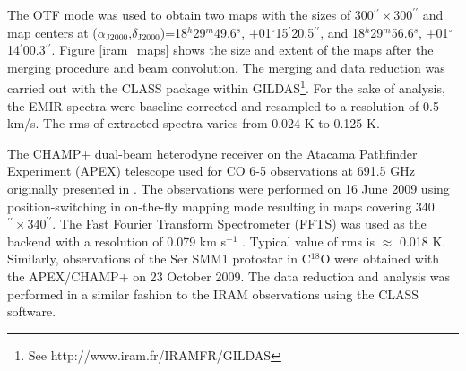 \documentclass{aa}
\begin{document}
The OTF mode was used to obtain two maps with the sizes of 300$^{\prime\prime}\times300^{\prime\prime}$ 
and map centers at ($\alpha_\mathrm{J2000}$,$\delta_\mathrm{J2000}$)=18$^h$29$^m$49.6$^s$,
+01$^{\circ}$15$^{\prime}$20.5$^{\prime\prime}$, and 18$^h$29$^m$56.6$^s$, +01$^{\circ}$14$^{\prime}$00.3$^{\prime\prime}$. 
Figure \ref{iram_maps} shows the size and extent of the maps after the merging procedure 
and beam convolution. The merging and data reduction was carried out with the CLASS package within GILDAS\footnote{See
http://www.iram.fr/IRAMFR/GILDAS}. For the sake of analysis, the EMIR spectra were
baseline-corrected and resampled to a resolution of 0.5 km/s. The rms of extracted spectra varies from 0.024 K to 0.125 K. 

The CHAMP+ dual-beam heterodyne receiver on the Atacama Pathfinder Experiment (APEX) telescope used for CO 6-5 observations at 691.5 GHz originally presented in \citealt{Yil15}. The observations were performed on 16 June 2009 using position-switching in on-the-fly mapping mode resulting in maps covering 340$^{\prime\prime}\times 340^{\prime\prime}$. The Fast Fourier Transform Spectrometer (FFTS) was used as the backend with a resolution of 0.079 km s$^{-1}$ \citep{Kle06}. Typical value of rms is $\approx$ 0.018 K. 
Similarly, observations of the Ser SMM1 protostar in C$^{18}$O were obtained with the APEX/CHAMP+ on 23 October 2009. The data reduction and analysis was performed in a similar fashion to the IRAM observations using the CLASS software.
\end{document}
